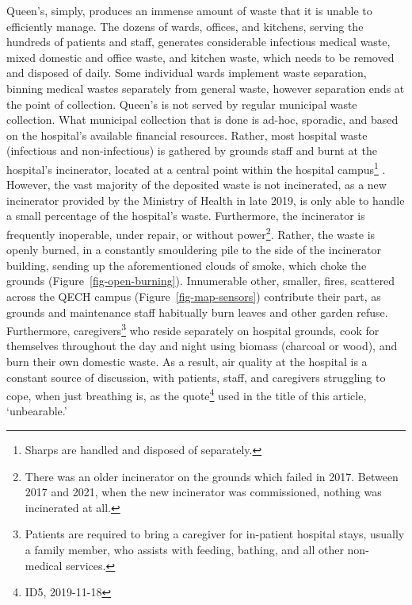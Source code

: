 \documentclass[
  authoryear,
  review,
  3p]{elsarticle}
\begin{document}
Queen's, simply, produces an immense amount of waste that it is unable
to efficiently manage. The dozens of wards, offices, and kitchens,
serving the hundreds of patients and staff, generates considerable
infectious medical waste, mixed domestic and office waste, and kitchen
waste, which needs to be removed and disposed of daily. Some individual
wards implement waste separation, binning medical wastes separately from
general waste, however separation ends at the point of collection.
Queen's is not served by regular municipal waste collection. What
municipal collection that is done is ad-hoc, sporadic, and based on the
hospital's available financial resources. Rather, most hospital waste
(infectious and non-infectious) is gathered by grounds staff and burnt
at the hospital's incinerator, located at a central point within the
hospital campus\footnote{Sharps are handled and disposed of separately.}
\citep{tilley2020wea}. However, the vast majority of the deposited waste
is not incinerated, as a new incinerator provided by the Ministry of
Health in late 2019, is only able to handle a small percentage of the
hospital's waste. Furthermore, the incinerator is frequently inoperable,
under repair, or without power\footnote{There was an older incinerator
  on the grounds which failed in 2017. Between 2017 and 2021, when the
  new incinerator was commissioned, nothing was incinerated at all.}.
Rather, the waste is openly burned, in a constantly smouldering pile to
the side of the incinerator building, sending up the aforementioned
clouds of smoke, which choke the grounds
(Figure~\ref{fig-open-burning}). Innumerable other, smaller, fires,
scattered across the QECH campus (Figure~\ref{fig-map-sensors})
contribute their part, as grounds and maintenance staff habitually burn
leaves and other garden refuse. Furthermore, caregivers\footnote{Patients
  are required to bring a caregiver for in-patient hospital stays,
  usually a family member, who assists with feeding, bathing, and all
  other non-medical services.} who reside separately on hospital
grounds, cook for themselves throughout the day and night using biomass
(charcoal or wood), and burn their own domestic waste. As a result, air
quality at the hospital is a constant source of discussion, with
patients, staff, and caregivers struggling to cope, when just breathing
is, as the quote\footnote{ID5, 2019-11-18} used in the title of this
article, `unbearable.'
\end{document}
